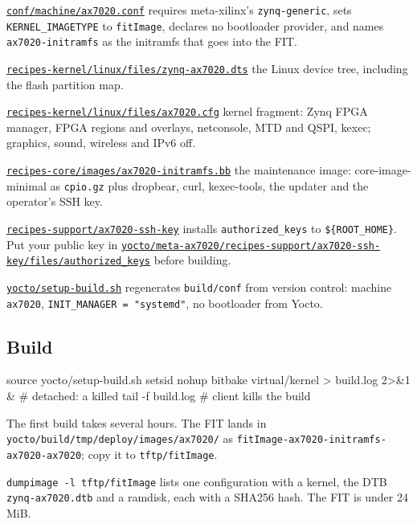 \documentclass[11pt,a4paper,oneside]{article}
\newcommand{\file}[1]{{\color{bluemid}\nolinkurl{#1}}}
\newcommand{\cmd}[1]{\texttt{#1}}
\newcommand{\repo}{https://github.com/MaxClerkwell/ax7020-bringup}
\newcommand{\rfile}[1]{\href{\repo/blob/master/#1}{\color{bluemid}\nolinkurl{#1}}}
\newcommand{\lfile}[1]{\href{\repo/blob/master/yocto/meta-ax7020/#1}{\color{bluemid}\nolinkurl{#1}}}
\begin{document}
\begin{filelist}
  \item[\lfile{conf/machine/ax7020.conf}] requires meta-xilinx's \cmd{zynq-generic}, sets \cmd{KERNEL\_IMAGETYPE} to \cmd{fitImage}, declares no bootloader provider, and names \cmd{ax7020-initramfs} as the initramfs that goes into the FIT.
  \item[\lfile{recipes-kernel/linux/files/zynq-ax7020.dts}] the Linux device tree, including the flash partition map.
  \item[\lfile{recipes-kernel/linux/files/ax7020.cfg}] kernel fragment: Zynq FPGA manager, FPGA regions and overlays, netconsole, MTD and QSPI, kexec; graphics, sound, wireless and IPv6 off.
  \item[\lfile{recipes-core/images/ax7020-initramfs.bb}] the maintenance image: core-image-minimal as \cmd{cpio.gz} plus dropbear, curl, kexec-tools, the updater and the operator's SSH key.
  \item[\lfile{recipes-support/ax7020-ssh-key}] installs \file{authorized_keys} to \cmd{\$\{ROOT\_HOME\}}. Put your public key in \rfile{yocto/meta-ax7020/recipes-support/ax7020-ssh-key/files/authorized_keys} before building.
  \item[\rfile{yocto/setup-build.sh}] regenerates \file{build/conf} from version control: machine \cmd{ax7020}, \cmd{INIT\_MANAGER = "systemd"}, no bootloader from Yocto.
\end{filelist}

\subsection{Build}

\begin{shell}
source yocto/setup-build.sh
setsid nohup bitbake virtual/kernel > build.log 2>&1 &     # detached: a killed
tail -f build.log                                          # client kills the build
\end{shell}

The first build takes several hours. The FIT lands in
\file{yocto/build/tmp/deploy/images/ax7020/} as
\file{fitImage-ax7020-initramfs-ax7020-ax7020}; copy it to \file{tftp/fitImage}.

\begin{checkpoint}
\cmd{dumpimage -l tftp/fitImage} lists one configuration with a kernel, the
DTB \cmd{zynq-ax7020.dtb} and a ramdisk, each with a SHA256 hash. The FIT is
under 24\,MiB.
\end{checkpoint}
\end{document}
